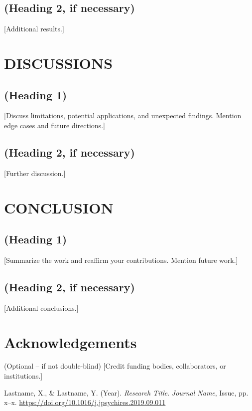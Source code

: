 \documentclass[11pt]{article}
\begin{document}
\subsection{(Heading 2, if necessary)}
[Additional results.]

\section{DISCUSSIONS}
\subsection{(Heading 1)}
[Discuss limitations, potential applications, and unexpected findings. Mention edge cases and future directions.]

\subsection{(Heading 2, if necessary)}
[Further discussion.]

\section{CONCLUSION}
\subsection{(Heading 1)}
[Summarize the work and reaffirm your contributions. Mention future work.]

\subsection{(Heading 2, if necessary)}
[Additional conclusions.]

\section*{Acknowledgements}
(Optional – if not double-blind) [Credit funding bodies, collaborators, or institutions.]

\begin{thebibliography}{99}
 Lastname, X., \& Lastname, Y. (Year). \textit{Research Title}. \textit{Journal Name}, Issue, pp. x--x. \href{https://doi.org/10.1016/j.jpsychires.2019.09.011}{https://doi.org/10.1016/j.jpsychires.2019.09.011}
\end{thebibliography}
\end{document}
